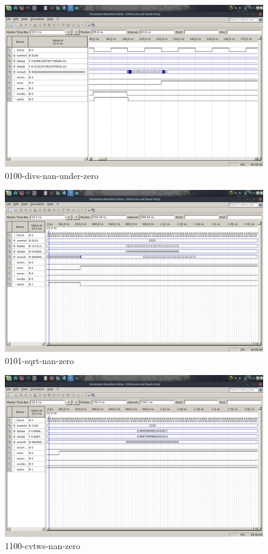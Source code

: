 \documentclass[12pt]{article}
\begin{document}
\begin{figure}[H]
	\centering
	\includegraphics[width=.8\textwidth]{imagens2/0100-divs-nan-under-zero.png}
	\caption{0100-divs-nan-under-zero}
	\label{fig:0100-divs-nan-under-zero}
\end{figure}



\begin{figure}[H]
	\centering
	\includegraphics[width=.8\textwidth]{imagens2/0101-sqrt-nan-zero.png}
	\caption{0101-sqrt-nan-zero}
	\label{fig:0101-sqrt-nan-zero}
\end{figure}

\begin{figure}[H]
	\centering
	\includegraphics[width=.8\textwidth]{imagens2/1100-cvtws-nan-zero.png}
	\caption{1100-cvtws-nan-zero}
	\label{fig:1100-cvtws-nan-zero}
\end{figure}
\end{document}
